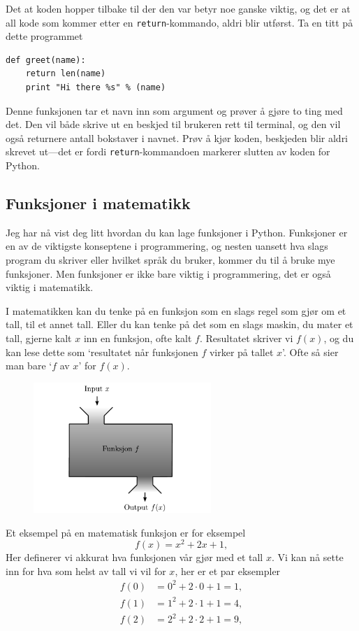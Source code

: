 \documentclass[a4paper, 11pt, notitlepage]{article}
\begin{document}
Det at koden hopper tilbake til der den var betyr noe ganske viktig, og det er at all kode som kommer etter en \verb+return+-kommando, aldri blir utførst. Ta en titt på dette programmet
\begin{lstlisting}
def greet(name):
	return len(name)
	print "Hi there %s" % (name)
\end{lstlisting}
Denne funksjonen tar et navn inn som argument og prøver å gjøre to ting med det. Den vil både skrive ut en beskjed til brukeren rett til terminal, og den vil også returnere antall bokstaver i navnet. Prøv å kjør koden, beskjeden blir aldri skrevet ut---det er fordi \verb+return+-kommandoen markerer slutten av koden for Python.


\subsection*{Funksjoner i matematikk}

Jeg har nå vist deg litt hvordan du kan lage funksjoner i Python. Funksjoner er en av de viktigste konseptene i programmering, og nesten uansett hva slags program du skriver eller hvilket språk du bruker, kommer du til å bruke mye funksjoner. Men funksjoner er ikke bare viktig i programmering, det er også viktig i matematikk.

I matematikken kan du tenke på en funksjon som en slags regel som gjør om et tall, til et annet tall. Eller du kan tenke på det som en slags maskin, du mater et tall, gjerne kalt $x$ inn en funksjon, ofte kalt $f$. Resultatet skriver vi $f(x)$, og du kan lese dette som `resultatet når funksjonen $f$ virker på tallet $x$'. Ofte så sier man bare `$f$ av $x$' for $f(x)$.

\begin{figure}[h]
\centering
	\includegraphics[width=0.6\textwidth]{function_blackbox}
\end{figure}

Et eksempel på en matematisk funksjon er for eksempel
$$f(x) = x^2 + 2x + 1,$$
Her definerer vi akkurat hva funksjonen vår gjør med et tall $x$. Vi kan nå sette inn for hva som helst av tall vi vil for $x$, her er et par eksempler
\begin{align*}
f(0) &= 0^2 + 2\cdot 0 + 1 = 1, \\
f(1) &= 1^2 + 2\cdot 1 + 1 = 4, \\
f(2) &= 2^2 + 2\cdot 2 + 1 = 9, \\
\end{align*}
\end{document}
